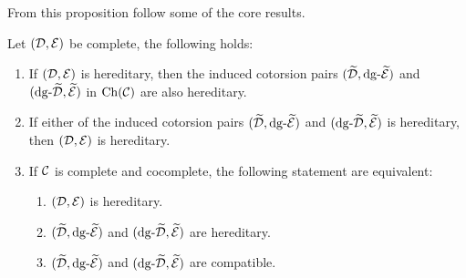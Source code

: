 From this proposition follow some of the core results.

\begin{corollary}
    Let $(\D, \E)$ be complete, the following holds:
    \begin{enumerate}
        \itemsep0em 
        \item If $(\D, \E)$ is hereditary, then the induced cotorsion pairs $(\DD, \dg{\E})$ and $(\dg{\D}, \EE)$ in $\Ch(\C)$ are also hereditary.
        \item If either of the induced cotorsion pairs $(\DD, \dg{\E})$ and $(\dg{\D}, \EE)$ is hereditary, then $(\D, \E)$ is hereditary.
        \item If $\C$ is complete and cocomplete, the following statement are equivalent:
        \begin{enumerate}
            \itemsep0em
            \item $(\D, \E)$ is hereditary.
            \item $(\DD, \dg{\E})$ and $(\dg{\D}, \EE)$ are hereditary.
            \item $(\DD, \dg{\E})$ and $(\dg{\D}, \EE)$ are compatible.
        \end{enumerate}
    \end{enumerate}
\end{corollary}

